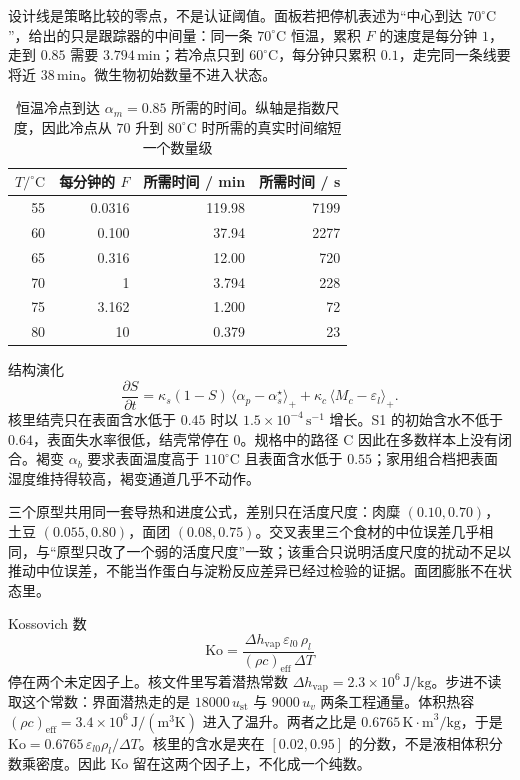 设计线是策略比较的零点，不是认证阈值。面板若把停机表述为“中心到达 \(70^\circ\mathrm{C}\)”，给出的只是跟踪器的中间量：同一条 \(70^\circ\mathrm{C}\) 恒温，累积 \(F\) 的速度是每分钟 \(1\)，走到 \(0.85\) 需要 \(3.794\,\mathrm{min}\)；若冷点只到 \(60^\circ\mathrm{C}\)，每分钟只累积 \(0.1\)，走完同一条线要将近 \(38\,\mathrm{min}\)。微生物初始数量不进入状态。

\begin{table}[htbp]
\centering
\caption{恒温冷点到达 \(\alpha_m=0.85\) 所需的时间。纵轴是指数尺度，因此冷点从 \(70\) 升到 \(80^\circ\mathrm{C}\) 时所需的真实时间缩短一个数量级}
\label{tab:constT}
{\small
\begin{tabular}{@{}rrrr@{}}
\toprule
\(T/^\circ\mathrm{C}\) & 每分钟的 \(F\) & 所需时间 / min & 所需时间 / s \\
\midrule
55 & 0.0316 & 119.98 & 7199 \\
60 & 0.100 & 37.94 & 2277 \\
65 & 0.316 & 12.00 & 720 \\
70 & 1 & 3.794 & 228 \\
75 & 3.162 & 1.200 & 72 \\
80 & 10 & 0.379 & 23 \\
\bottomrule
\end{tabular}}
\end{table}

结构演化
\begin{equation}
\label{eq:structure}
\frac{\partial S}{\partial t}
=\kappa_s(1-S)\,\langle\alpha_p-\alpha_s^\star\rangle_+
+\kappa_c\,\langle M_{c}- \varepsilon_l\rangle_+.
\end{equation}
核里结壳只在表面含水低于 \(0.45\) 时以 \(1.5\times 10^{-4}\,\mathrm{s}^{-1}\) 增长。S1 的初始含水不低于 \(0.64\)，表面失水率很低，结壳常停在 \(0\)。规格中的路径 C 因此在多数样本上没有闭合。褐变 \(\alpha_b\) 要求表面温度高于 \(110^\circ\mathrm{C}\) 且表面含水低于 \(0.55\)；家用组合档把表面湿度维持得较高，褐变通道几乎不动作。

三个原型共用同一套导热和进度公式，差别只在活度尺度：肉糜 \((0.10,0.70)\)，土豆 \((0.055,0.80)\)，面团 \((0.08,0.75)\)。交叉表里三个食材的中位误差几乎相同，与“原型只改了一个弱的活度尺度”一致；该重合只说明活度尺度的扰动不足以推动中位误差，不能当作蛋白与淀粉反应差异已经过检验的证据。面团膨胀不在状态里。

Kossovich 数
\[
\mathrm{Ko}
=\frac{\Delta h_{\mathrm{vap}}\,\varepsilon_{l0}\,\rho_l}{(\rho c)_{\mathrm{eff}}\,\Delta T}
\]
停在两个未定因子上。核文件里写着潜热常数 \(\Delta h_{\mathrm{vap}}=2.3\times 10^{6}\,\mathrm{J/kg}\)。步进不读取这个常数：界面潜热走的是 \(18000\,u_{\mathrm{st}}\) 与 \(9000\,u_v\) 两条工程通量。体积热容 \((\rho c)_{\mathrm{eff}}=3.4\times 10^{6}\,\mathrm{J}/(\mathrm{m}^3\mathrm{K})\) 进入了温升。两者之比是 \(0.6765\,\mathrm{K\cdot m}^3/\mathrm{kg}\)，于是 \(\mathrm{Ko}=0.6765\,\varepsilon_{l0}\rho_l/\Delta T\)。核里的含水是夹在 \([0.02,0.95]\) 的分数，不是液相体积分数乘密度。因此 Ko 留在这两个因子上，不化成一个纯数。

